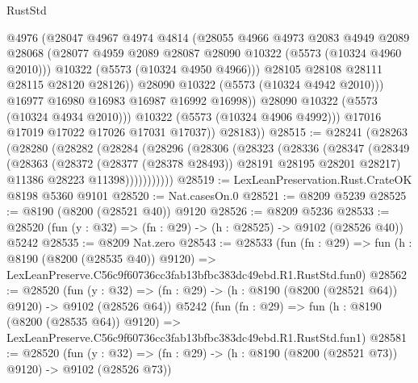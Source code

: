 \begin{lexlean}{RustStd}
\begin{coremodule}
                        @4976
                        (@28047
                          @4967
                          @4974
                          @4814
                          (@28055
                            @4966
                            @4973
                            @2083
                            @4949
                            @2089
                            @28068
                            (@28077 @4959 @2089 @28087 @28090 @10322 (@5573 (@10324 @4960 @2010)))
                            @10322
                            (@5573 (@10324 @4950 @4966)))
                          @28105
                          @28108
                          @28111
                          @28115
                          @28120
                          @28126))
                      @28090
                      @10322
                      (@5573 (@10324 @4942 @2010)))
                    @16977
                    @16980
                    @16983
                    @16987
                    @16992
                    @16998))
                @28090
                @10322
                (@5573 (@10324 @4934 @2010)))
              @10322
              (@5573 (@10324 @4906 @4992)))
            @17016
            @17019
            @17022
            @17026
            @17031
            @17037))
        @28183))
@28515 := @28241
    (@28263
      (@28280
        (@28282
          (@28284
            (@28296
              (@28306
                (@28323
                  (@28336
                    (@28347
                      (@28349
                        (@28363
                          (@28372 (@28377 (@28378 @28493)) @28191 @28195 @28201 @28217)
                          @11386
                          @28223
                          @11398)))))))))))
@28519 := LexLeanPreservation.Rust.CrateOK @8198 @5360 @9101
@28520 := Nat.casesOn.{0}
@28521 := @8209 @5239
@28525 := @8190 (@8200 (@28521 @40)) @9120
@28526 := @8209 @5236
@28533 := @28520 (fun (y : @32) => (fn : @29) -> (h : @28525) -> @9102 (@28526 @40)) @5242
@28535 := @8209 Nat.zero
@28543 := @28533
    (fun (fn : @29) =>
    fun (h : @8190 (@8200 (@28535 @40)) @9120) =>
    LexLeanPreserve.C56c9f60736cc3fab13bfbc383dc49ebd.R1.RustStd.fun0)
@28562 := @28520
    (fun (y : @32) => (fn : @29) -> (h : @8190 (@8200 (@28521 @64)) @9120) -> @9102 (@28526 @64))
    @5242
    (fun (fn : @29) =>
    fun (h : @8190 (@8200 (@28535 @64)) @9120) =>
    LexLeanPreserve.C56c9f60736cc3fab13bfbc383dc49ebd.R1.RustStd.fun1)
@28581 := @28520
    (fun (y : @32) => (fn : @29) -> (h : @8190 (@8200 (@28521 @73)) @9120) -> @9102 (@28526 @73))

\end{coremodule}
\end{lexlean}
